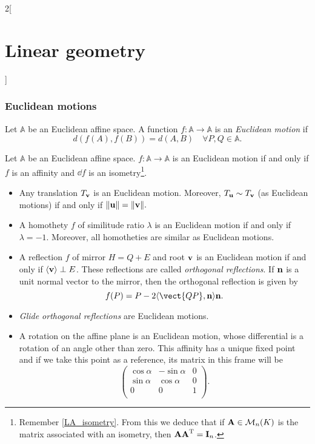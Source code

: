 \documentclass[../../../main.tex]{subfiles}
\begin{document}
\begin{multicols}{2}[\section{Linear geometry}]
  \subsubsection{Euclidean motions}
  \label{LG_euclidean_motion}
  \begin{definition}
    Let $\mathbb{A}$ be an Euclidean affine space. A function $f:\mathbb{A}\rightarrow\mathbb{A}$ is an \emph{Euclidean motion} if $$d(f(A),f(B))=d(A,B)\quad\forall P,Q\in\mathbb{A}.$$
  \end{definition}
  \begin{proposition}
    Let $\mathbb{A}$ be an Euclidean affine space. $f:\mathbb{A}\rightarrow\mathbb{A}$ is an Euclidean motion if and only if $f$ is an affinity and $\dd{f}$ is an isometry\footnote{Remember \cref{LA_isometry}. From this we deduce that if $\boldsymbol{\mathrm{A}}\in\mathcal{M}_n(K)$ is the matrix associated with an isometry, then $\boldsymbol{\mathrm{A}}\vb{\boldsymbol{\mathrm{A}}}^{\mathrm{T}}=\boldsymbol{\mathrm{I}}_n$.}.
  \end{proposition}
  \begin{proposition}
    \hfill
    \begin{itemize}
      \item Any translation $T_{\boldsymbol{\mathrm{v}}}$ is an Euclidean motion. Moreover, $T_{\boldsymbol{\mathrm{u}}}\sim T_{\boldsymbol{\mathrm{v}}}$ (as Euclidean motions) if and only if $\|\boldsymbol{\mathrm{u}}\|=\|\boldsymbol{\mathrm{v}}\|.$
      \item A homothety $f$ of similitude ratio $\lambda$ is an Euclidean motion if and only if $\lambda=-1$. Moreover, all homotheties are similar as Euclidean motions.
      \item A reflection $f$ of mirror $H=Q+E$ and root $\boldsymbol{\mathrm{v}}$ is an Euclidean motion if and only if $\langle\boldsymbol{\mathrm{v}}\rangle\perp E$. These reflections are called \emph{orthogonal reflections}. If $\boldsymbol{\mathrm{n}}$ is a unit normal vector to the mirror, then the orthogonal reflection is given by $$f(P)=P-2\langle\vect{QP},\vf{n}\rangle\vf{n}.$$
      \item \emph{Glide orthogonal reflections} are Euclidean motions.
      \item A rotation on the affine plane is an Euclidean motion, whose differential is a rotation of an angle other than zero. This affinity has a unique fixed point and if we take this point as a reference, its matrix in this frame will be $$\begin{pmatrix}
                \cos\alpha & -\sin\alpha & 0 \\
                \sin\alpha & \cos\alpha  & 0 \\
                0          & 0           & 1 \\
              \end{pmatrix}.$$
    \end{itemize}
  \end{proposition}

\end{multicols}
\end{document}
